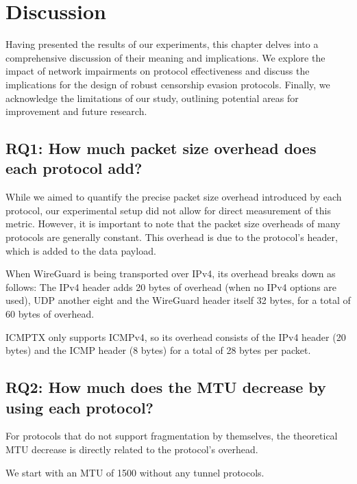 
\chapter{Discussion}
\label{chap:discussion}
Having presented the results of our experiments, this chapter delves into a comprehensive discussion of their meaning and implications.
We explore the impact of network impairments on protocol effectiveness and discuss the implications for the design of robust censorship evasion protocols.
Finally, we acknowledge the limitations of our study, outlining potential areas for improvement and future research.




\section{RQ1: How much packet size overhead does each protocol add?}
While we aimed to quantify the precise packet size overhead introduced by each protocol, our experimental setup did not allow for direct measurement of this metric.
However, it is important to note that the packet size overheads of many protocols are generally constant.
This overhead is due to the protocol's header, which is added to the data payload.

When WireGuard is being transported over IPv4, its overhead breaks down as follows: The IPv4 header adds 20 bytes of overhead (when no IPv4 options are used), UDP another eight and the WireGuard header itself 32 bytes, for a total of 60 bytes of overhead.

ICMPTX only supports ICMPv4, so its overhead consists of the IPv4 header (20 bytes) and the ICMP header (8 bytes) \cite{RFC0792} for a total of 28 bytes per packet.


\section{RQ2: How much does the MTU decrease by using each protocol?}
For protocols that do not support fragmentation by themselves, the theoretical MTU decrease is directly related to the protocol's overhead.

We start with an MTU of 1500 without any tunnel protocols.

